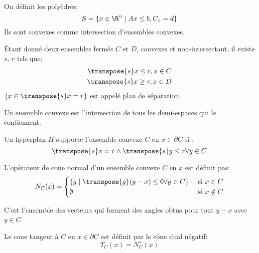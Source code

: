 \documentclass[math]{cours}
\begin{document}
\begin{definition}
	On définit les polyèdres:
	\begin{equation*}
		S = \left\{ x \in \R^{n} \mid Ax \leq b, C_{x} = d \right\}
	\end{equation*}
	Ils sont convexes comme intersection d'ensembles convexes.
\end{definition}

\begin{thm}
	Étant donné deux ensembles fermés $C$ et $D$, convexes et non-intersectant, il existe $s$, $r$ tels que:
	\begin{align*}
		\transpose{s}x \leq r, x \in C \\
		\transpose{s}x \geq r, x \in D
	\end{align*}
	$\left\{ x \in \transpose{s}x = r \right\}$ est appelé plan de séparation.
\end{thm}

\begin{thm}
	Un ensemble convexe est l'intersection de tous les demi-espaces qui le contiennent.
\end{thm}

\begin{definition}
	Un hyperplan $H$ supporte l'ensemble convexe $C$ en $x \in \partial C$ si :
	\begin{equation*}
		\transpose{s}x = r \land \transpose{s}y \leq r \forall y \in C
	\end{equation*}
\end{definition}

\begin{definition}
	L'opérateur de cone normal d'un ensemble convexe $C$ en $x$ est définit pas:
	\begin{equation*}
		N_{C}(x) = \begin{cases}
			\left\{ g \mid \transpose{g}(y - x) \leq 0 \forall y \in C \right\} & \text{ si } x\in C     \\
			\emptyset                                                           & \text{ si } x \notin C
		\end{cases}
	\end{equation*}
\end{definition}

C'est l'ensemble des vecteurs qui forment des angles obtus pour tout $y - x$ avec $y \in C$.

\begin{definition}
	Le cone tangent à $C$ en $x \in \partial C$ est définit par le cône dual négatif:
	\begin{equation*}
		T_{C}(x) = N_{C}^{\diamond}(x)
	\end{equation*}
\end{definition}
\end{document}
